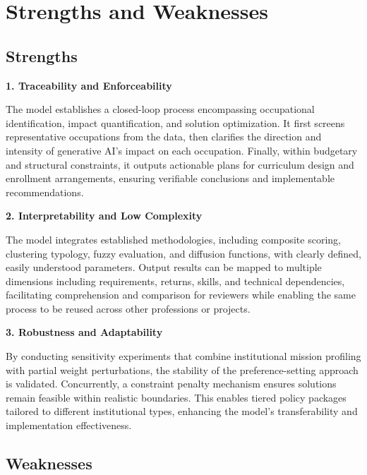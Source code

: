 \documentclass{mcmthesis}
\begin{document}
\section{Strengths and Weaknesses}
\subsection{Strengths}
\noindent\textbf{1. Traceability and Enforceability}

The model establishes a closed-loop process encompassing occupational identification, impact quantification, and solution optimization. It first screens representative occupations from the data, then clarifies the direction and intensity of generative AI's impact on each occupation. Finally, within budgetary and structural constraints, it outputs actionable plans for curriculum design and enrollment arrangements, ensuring verifiable conclusions and implementable recommendations.

\medskip

\noindent\textbf{2. Interpretability and Low Complexity}

The model integrates established methodologies, including composite scoring, clustering typology, fuzzy evaluation, and diffusion functions, with clearly defined, easily understood parameters. Output results can be mapped to multiple dimensions including requirements, returns, skills, and technical dependencies, facilitating comprehension and comparison for reviewers while enabling the same process to be reused across other professions or projects.

\medskip

\noindent\textbf{3. Robustness and Adaptability}

By conducting sensitivity experiments that combine institutional mission profiling with partial weight perturbations, the stability of the preference-setting approach is validated. Concurrently, a constraint penalty mechanism ensures solutions remain feasible within realistic boundaries. This enables tiered policy packages tailored to different institutional types, enhancing the model's transferability and implementation effectiveness.

\subsection{Weaknesses}
\end{document}
